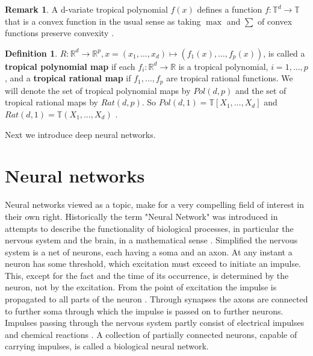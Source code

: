 \documentclass{article}
\theoremstyle{definition}
\newtheorem{definition}[theorem]{Definition}
\newtheorem{remark}[theorem]{Remark}
\begin{document}
\begin{remark}
A d-variate tropical polynomial $f(x)$ defines a function $f: \mathbb{T}^{d} \to \mathbb{T}$ that is a convex function in the usual sense as taking $\max$ and $\sum$ of convex functions preserve convexity \cite{boyd2004convex}.
\end{remark}

\begin{definition}
$R : \mathbb{R}^{d} \to \mathbb{R}^{p}, x = (x_1, \dots , x_d)\mapsto (f_1(x), \dots , f_p(x))$, is called a \textbf{tropical polynomial map} if each $f_i : \mathbb{R}^{d} \to \mathbb{R}$ is a tropical polynomial, $i = 1, \dots , p$, and a \textbf{tropical rational map} if $f_1, \dots , f_p$ are tropical rational functions. We will denote the set of tropical polynomial maps by $Pol(d, p)$ and the set of tropical rational maps by $Rat(d, p)$. So $Pol(d, 1) = \mathbb{T}[X_1, \dots , X_d]$ and $Rat(d, 1) = \mathbb{T}(X_1, \dots , X_d)$ \cite[p.~3]{zhang2018tropical}.
\end{definition}

Next we introduce deep neural networks.

\newpage

\section{Neural networks}
\label{sec:neural_networks}
Neural networks viewed as a topic, make for a very compelling field of interest in their own right. Historically the term "Neural Network" was introduced in attempts to describe the functionality of biological processes, in particular the nervous system and the brain, in a mathematical sense \cite{mcculloch1943logical, widrow1960adaptive, rumelhart1986learning}. Simplified the nervous system is a net of neurons, each having a soma and an axon. At any instant a neuron has some threshold, which excitation must exceed to initiate an impulse. This, except for the fact and the time of its occurrence, is determined by the neuron, not by the excitation. From the point of excitation the impulse is propagated to all parts of the neuron \cite{mcculloch1943logical}. Through synapses the axons are connected to further soma through which the impulse is passed on to further neurons. Impulses passing through the nervous system partly consist of electrical impulses and chemical reactions \cite{palay1956synapses}. A collection of partially connected neurons, capable of carrying impulses, is called a biological neural network.
\end{document}
